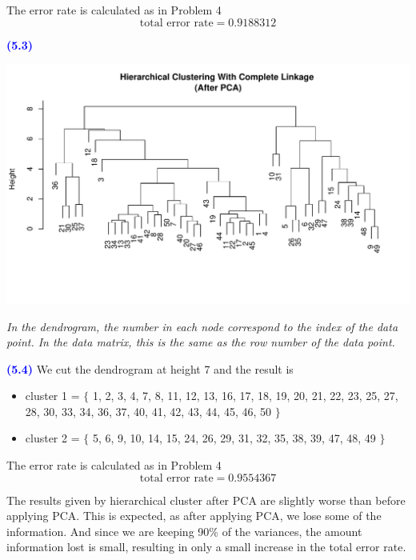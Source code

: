\documentclass[a4paper,12pt]{article}
\newcommand{\qnum}[1]{\noindent\textcolor{blue}{\textbf{(#1)}}}
\begin{document}
The error rate is calculated as in Problem 4
\[
    \text{total error rate} = 0.9188312
\]




\qnum{5.3}
\begin{center}
  \includegraphics[width=1\linewidth]{Image/Prob5-3.pdf}
  
  \vspace{-40pt}
  \parbox{0.9\textwidth}{\textit{In the dendrogram, the number in each node correspond to the index of the data point. In the data matrix, this is the same as the row number of the data point.
  }}
\end{center}
\bigskip\bigskip


\qnum{5.4}
We cut the dendrogram at height 7 and the result is 
\begin{itemize}
    \item cluster 1 = $\{$
        1, 2, 3, 4, 7, 8, 11, 12, 13, 16, 17, 18, 19, 20, 21, 22, 23, 25, 27, 28, 30, 33, 34, 36, 37, 40, 41, 42, 43, 44, 45, 46, 50
    $\}$
    \item cluster 2 = $\{$
        5, 6, 9, 10, 14, 15, 24, 26, 29, 31, 32, 35, 38, 39, 47, 48, 49
    $\}$
\end{itemize}


The error rate is calculated as in Problem 4
\[
    \text{total error rate} = 0.9554367
\]

The results given by hierarchical cluster after PCA are slightly worse than before applying PCA. 
This is expected, as after applying PCA, we lose some of the information. And since we are keeping 90\% of the variances, the amount information lost is small, resulting in only a small increase in the total error rate.
\end{document}
